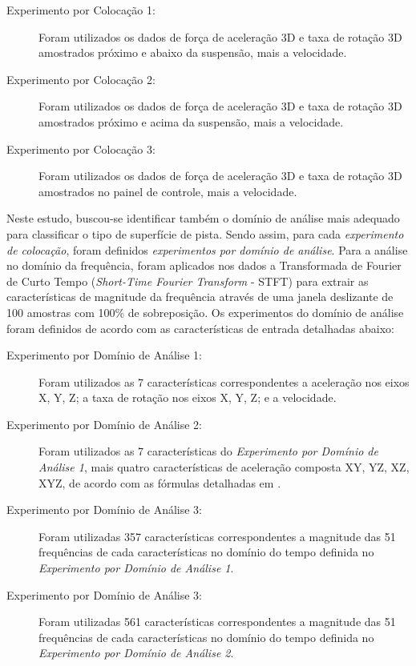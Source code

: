 \begin{description}
	
	\item[Experimento por Colocação 1:] Foram utilizados os dados de força de aceleração 3D e taxa de rotação 3D amostrados próximo e abaixo da suspensão, mais a velocidade.
    
    \item[Experimento por Colocação 2:] Foram utilizados os dados de força de aceleração 3D e taxa de rotação 3D amostrados próximo e acima da suspensão, mais a velocidade.
    
    \item[Experimento por Colocação 3:] Foram utilizados os dados de força de aceleração 3D e taxa de rotação 3D amostrados no painel de controle, mais a velocidade.
    
\end{description}

Neste estudo, buscou-se identificar também o domínio de análise mais adequado para classificar o tipo de superfície de pista. Sendo assim, para cada \emph{experimento de colocação}, foram definidos \emph{experimentos por domínio de análise}. Para a análise no domínio da frequência, foram aplicados nos dados a Transformada de Fourier de Curto Tempo (\textit{Short-Time Fourier Transform} - STFT) para extrair as características de magnitude da frequência através de uma janela deslizante de 100 amostras com 100\% de sobreposição. Os experimentos do domínio de análise foram definidos de acordo com as características de entrada detalhadas abaixo:

\begin{description}

    \item[Experimento por Domínio de Análise 1:] Foram utilizados as 7 características correspondentes a aceleração nos eixos X, Y, Z; a taxa de rotação nos eixos X, Y, Z; e a velocidade.
    
    \item[Experimento por Domínio de Análise 2:] Foram utilizados as 7 características do \emph{Experimento por Domínio de Análise 1}, mais quatro características de aceleração composta XY, YZ, XZ, XYZ, de acordo com as fórmulas detalhadas em \cite{Tan2019}.
    
    \item[Experimento por Domínio de Análise 3:] Foram utilizadas 357 características correspondentes a magnitude das 51 frequências de cada características no domínio do tempo definida no \emph{Experimento por Domínio de Análise 1}.
    
    \item[Experimento por Domínio de Análise 3:] Foram utilizadas 561 características correspondentes a magnitude das 51 frequências de cada características no domínio do tempo definida no \emph{Experimento por Domínio de Análise 2}.
    
\end{description}

